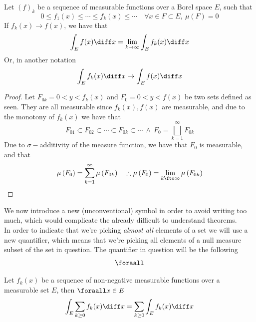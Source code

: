 \documentclass[../mmf.tex]{subfiles}
\begin{document}
\begin{thm}
	Let $(f)_k$ be a sequence of measurable functions over a Borel space $E$, such that
	\begin{equation*}
		0\le f_1(x)\le\cdots\le f_k(x)\le\cdots\quad\forall x\in F\subset E,\ \mu(F)=0
	\end{equation*}
	If $f_k(x)\to f(x)$, we have that
	\begin{equation}
		\int_{E}^{}f(x)\diff x=\lim_{k\to\infty}\int_{E}^{}f_k(x)\diff x
		\label{eq:intconv}
	\end{equation}
	Or, in another notation
	\begin{equation}
		\int_{E}^{}f_k(x)\diff x\to\int_{E}^{}f(x)\diff x
		\label{eq:intconv2}
	\end{equation}
\end{thm}
\begin{proof}
	Let $F_{0k}={0<y<f_k(x)}$ and $F_{0}={0<y<f(x)}$ be two sets defined as seen. They are all measurable since $f_k(x),f(x)$ are measurable, and due to the monotony of $f_k(x)$ we have that
	\begin{equation*}
		F_{01}\subset F_{02}\subset\cdots\subset F_{0k}\subset\cdots\ \wedge\ F_0=\bigsqcup_{k=1}^\infty F_{0k}
	\end{equation*}
	Due to $\sigma-$additivity of the measure function, we have that $F_0$ is measurable, and that
	\begin{equation*}
		\mu\left( F_0 \right)=\sum_{k=1}^{\infty}\mu\left( F_{0k} \right)\quad\therefore\mu\left( F_0 \right)=\lim_{k\fto\infty}\mu\left( F_{0k} \right)
	\end{equation*}
\end{proof}
\begin{ntn}
	We now introduce a new (unconventional) symbol in order to avoid writing too much, which would complicate the already difficult to understand theorems.\\
	In order to indicate that we're picking \textit{almost all} elements of a set we will use a new quantifier, which means that we're picking all elements of a null measure subset of the set in question. The quantifier in question will be the following
	\begin{equation}
		\foraall
		\label{ntn:foralmostall}
	\end{equation}
\end{ntn}
\begin{cor}
	Let $f_k(x)$ be a sequence of non-negative measurable functions over a measurable set $E$, then $\foraall x\in E$
	\begin{equation}
		\int_{E}^{}\sum_{k\ge0}f_k(x)\diff x=\sum_{k\ge0}^{}\int_{E}^{}f_k(x)\diff x
		\label{eq:sumintleb}
	\end{equation}
\end{cor}
\end{document}
